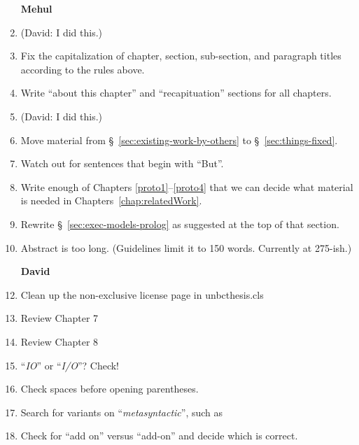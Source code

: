 \begin{scope}
\begin{enumerate}
\item [\textbf{Mehul}]

\item (David: I did this.)

\item
  Fix the capitalization of chapter,
  section, sub-section, and paragraph titles according to the rules above.

\item
  Write ``about this chapter'' and ``recapituation'' sections for all chapters.

\item
  (David: I did this.)

\item
    Move material from \S~\ref{sec:existing-work-by-others} to \S~\ref{sec:things-fixed}. 

\item
  Watch out for sentences that begin with ``But''.

\item
  Write enough of Chapters \ref{proto1}--\ref{proto4} that we can decide
  what material is needed in Chapters~\ref{chap:relatedWork}.

\item
  Rewrite \S~\ref{sec:exec-models-prolog} as suggested at the top of that section. 

\item
  Abstract is too long.  (Guidelines limit it to 150 words.  Currently
  at 275-ish.)



\item [\textbf{David}]
\item Clean up the non-exclusive license page in unbcthesis.cls
\item Review Chapter 7
\item Review Chapter 8
\item ``\textit{IO}'' or ``\textit{I/O}''?  Check!
\item Check spaces before opening parentheses.
\item Search for variants on ``\textit{metasyntactic}'', such as
\item Check for ``add on'' versus ``add-on'' and decide which is correct.
\end{enumerate}


\end{scope}
